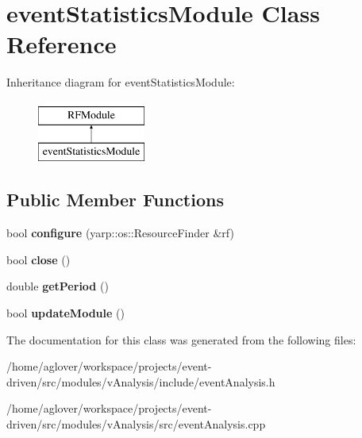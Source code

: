 \hypertarget{classeventStatisticsModule}{}\section{event\+Statistics\+Module Class Reference}
\label{classeventStatisticsModule}
Inheritance diagram for event\+Statistics\+Module\+:\begin{figure}[H]
\begin{center}
\leavevmode
\includegraphics[height=2.000000cm]{classeventStatisticsModule}
\end{center}
\end{figure}
\subsection*{Public Member Functions}
\begin{DoxyCompactItemize}
\item 
bool {\bfseries configure} (yarp\+::os\+::\+Resource\+Finder \&rf)\hypertarget{classeventStatisticsModule_a1ca7b5499ca668297430d3976ce3b1d1}{}\label{classeventStatisticsModule_a1ca7b5499ca668297430d3976ce3b1d1}

\item 
bool {\bfseries close} ()\hypertarget{classeventStatisticsModule_ab11f4b9fdd8ec0d8f3aa0bcb415fef9c}{}\label{classeventStatisticsModule_ab11f4b9fdd8ec0d8f3aa0bcb415fef9c}

\item 
double {\bfseries get\+Period} ()\hypertarget{classeventStatisticsModule_a7e1825323f24dd316be0f7cb7eac80d2}{}\label{classeventStatisticsModule_a7e1825323f24dd316be0f7cb7eac80d2}

\item 
bool {\bfseries update\+Module} ()\hypertarget{classeventStatisticsModule_a08194f3ae070dc20ef93a403644ab5a6}{}\label{classeventStatisticsModule_a08194f3ae070dc20ef93a403644ab5a6}

\end{DoxyCompactItemize}


The documentation for this class was generated from the following files\+:\begin{DoxyCompactItemize}
\item 
/home/aglover/workspace/projects/event-\/driven/src/modules/v\+Analysis/include/event\+Analysis.\+h\item 
/home/aglover/workspace/projects/event-\/driven/src/modules/v\+Analysis/src/event\+Analysis.\+cpp\end{DoxyCompactItemize}
